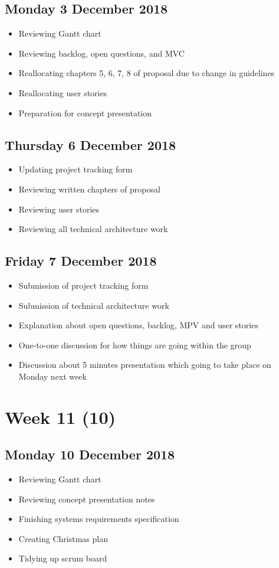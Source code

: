 \subsection*{Monday 3 December 2018}
\begin{itemize}
	\item Reviewing Gantt chart
	\item Reviewing backlog, open questions, and MVC
	\item Reallocating chapters 5, 6, 7, 8 of proposal due to change in guidelines
	\item Reallocating user stories
	\item Preparation for concept presentation
\end{itemize}

\subsection*{Thursday 6 December 2018}
\begin{itemize}
	\item Updating project tracking form
	\item Reviewing written chapters of proposal
	\item Reviewing user stories
	\item Reviewing all technical architecture work
\end{itemize}

\subsection*{Friday 7 December 2018}
\begin{itemize}
	\item Submission of project tracking form
	\item Submission of technical architecture work
	\item Explanation about open questions, backlog, MPV and user stories
	\item One-to-one discussion for how things are going within the group
	\item Discussion about 5 minutes presentation which going to take place on Monday next week
\end{itemize}

\section*{Week 11 (10)}
\subsection*{Monday 10 December 2018}
\begin{itemize}
	\item Reviewing Gantt chart
    \item Reviewing concept presentation notes
    \item Finishing systems requirements specification
    \item Creating Christmas plan
    \item Tidying up scrum board
\end{itemize}

